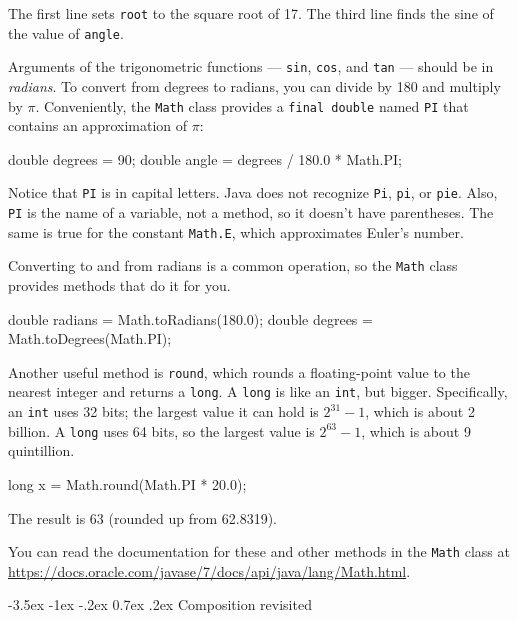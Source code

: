 \documentclass[12pt]{book}
\makeatletter
\theoremstyle{exercise}
\newcommand{\java}[1]{\verb"#1"}
\renewcommand{\section}{\@startsection{section}{1}{\z@}%
    {-3.5ex \@plus -1ex \@minus -.2ex}%
    {0.7ex \@plus.2ex}%
    {\normalfont\Large\bfseries}}
\newcommand{\java}[1]{\lstinline{#1}} %
\makeatother
\begin{document}
The first line sets \java{root} to the square root of 17.
The third line finds the sine of the value of \java{angle}.


Arguments of the trigonometric functions --- \java{sin}, \java{cos}, and \java{tan} --- should be in {\em radians}.
To convert from degrees to radians, you can divide by 180 and multiply by $\pi$.
Conveniently, the \java{Math} class provides a \java{final double} named \java{PI} that contains an approximation of $\pi$:

\begin{code}
    double degrees = 90;
    double angle = degrees / 180.0 * Math.PI;
\end{code}

Notice that \java{PI} is in capital letters.
Java does not recognize \java{Pi}, \java{pi}, or \java{pie}.
Also, \java{PI} is the name of a variable, not a method, so it doesn't have parentheses.
The same is true for the constant \java{Math.E}, which approximates Euler's number.

Converting to and from radians is a common operation, so the \java{Math} class provides methods that do it for you.

\begin{code}
    double radians = Math.toRadians(180.0);
    double degrees = Math.toDegrees(Math.PI);
\end{code}


Another useful method is \java{round}, which rounds a floating-point value to the nearest integer and returns a \java{long}.
A \java{long} is like an \java{int}, but bigger.
Specifically, an \java{int} uses 32 bits; the largest value it can hold is $2^{31}-1$, which is about 2 billion.
A \java{long} uses 64 bits, so the largest value is $2^{63}-1$, which is about 9 quintillion.

\begin{code}
    long x = Math.round(Math.PI * 20.0);
\end{code}

The result is 63 (rounded up from 62.8319).

You can read the documentation for these and other methods in the \java{Math} class at \url{https://docs.oracle.com/javase/7/docs/api/java/lang/Math.html}.


\section{Composition revisited}
\end{document}
